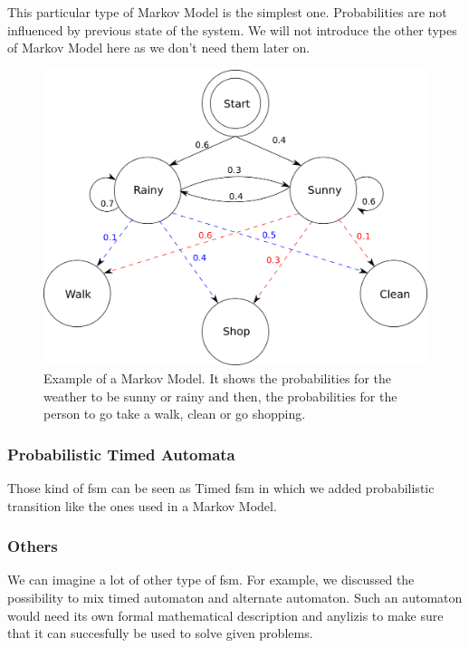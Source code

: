 \documentclass[12pt]{article}
\begin{document}
This particular type of Markov Model is the simplest one. Probabilities are not influenced by previous state of the system. We will not introduce the other types of Markov Model here as we don't need them later on.

\begin{figure}
    \centering
    \includegraphics[scale=0.3]{MarkovModel.png}
    \caption{Example of a Markov Model. It shows the probabilities for the weather to be sunny or rainy and then, the probabilities for the person to go take a walk, clean or go shopping.}
    \label{MarkovModel}
\end{figure}

\subsubsection{Probabilistic Timed Automata}

Those kind of \gls{fsm} can be seen as Timed \gls{fsm} in which we added probabilistic transition like the ones used in a Markov Model.

\subsubsection{Others}

We can imagine a lot of other type of \gls{fsm}. For example, we discussed the possibility to mix timed automaton and alternate automaton. Such an automaton would need its own formal mathematical description and anylizis to make sure that it can succesfully be used to solve given problems.\\
\end{document}
